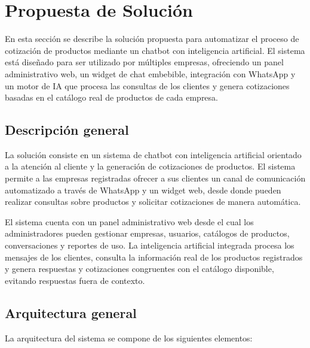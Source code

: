 \section{Propuesta de Solución}
\label{ch:propuesta_solucion}

En esta sección se describe la solución propuesta para automatizar el proceso de cotización de productos mediante un chatbot con inteligencia artificial. El sistema está diseñado para ser utilizado por múltiples empresas, ofreciendo un panel administrativo web, un widget de chat embebible, integración con WhatsApp y un motor de IA que procesa las consultas de los clientes y genera cotizaciones basadas en el catálogo real de productos de cada empresa.

\subsection{Descripción general}
\label{sec:descripcion_general}

La solución consiste en un sistema de chatbot con inteligencia artificial orientado a la atención al cliente y la generación de cotizaciones de productos. El sistema permite a las empresas registradas ofrecer a sus clientes un canal de comunicación automatizado a través de WhatsApp y un widget web, desde donde pueden realizar consultas sobre productos y solicitar cotizaciones de manera automática.

El sistema cuenta con un panel administrativo web desde el cual los administradores pueden gestionar empresas, usuarios, catálogos de productos, conversaciones y reportes de uso. La inteligencia artificial integrada procesa los mensajes de los clientes, consulta la información real de los productos registrados y genera respuestas y cotizaciones congruentes con el catálogo disponible, evitando respuestas fuera de contexto.

\subsection{Arquitectura general}
\label{sec:arquitectura_general}

La arquitectura del sistema se compone de los siguientes elementos:

